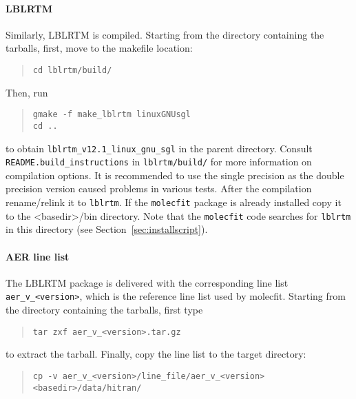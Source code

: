 \paragraph*{LBLRTM}
Similarly, \ac{LBLRTM} is compiled. Starting from the directory containing the
tarballs, first, move to the makefile location:
\begin{quote}
  \begin{small}
    \begin{verbatim}
cd lblrtm/build/
    \end{verbatim}
  \end{small}
\end{quote}
Then, run
\begin{quote}
  \begin{small}
    \begin{verbatim}
gmake -f make_lblrtm linuxGNUsgl
cd ..
    \end{verbatim}
  \end{small}
\end{quote}
to obtain \verb|lblrtm_v12.1_linux_gnu_sgl| in the parent directory.
Consult \verb|README.build_instructions| in \verb|lblrtm/build/| for more
information on compilation options. It is recommended to use the single
precision as the double precision version caused problems in various tests.
After the compilation rename/relink it to \verb|lblrtm|. If the
\verb|molecfit| package is already installed copy it to the <basedir>/bin
directory. Note that the \verb|molecfit| code searches for \verb|lblrtm| in
this directory (see Section~\ref{sec:installscript}).

\paragraph*{AER line list}
The LBLRTM package is delivered with the corresponding line list
{\tt aer\_v\_<version>}, which is the reference line list used by molecfit.
Starting from the directory containing the tarballs, first type
\begin{quote}
  \begin{small}
    \begin{verbatim}
tar zxf aer_v_<version>.tar.gz
    \end{verbatim}
  \end{small}
\end{quote}
to extract the tarball. Finally, copy the line list to the target directory:
\begin{quote}
  \begin{small}
    \begin{verbatim}
cp -v aer_v_<version>/line_file/aer_v_<version> <basedir>/data/hitran/
    \end{verbatim}
  \end{small}
\end{quote}

